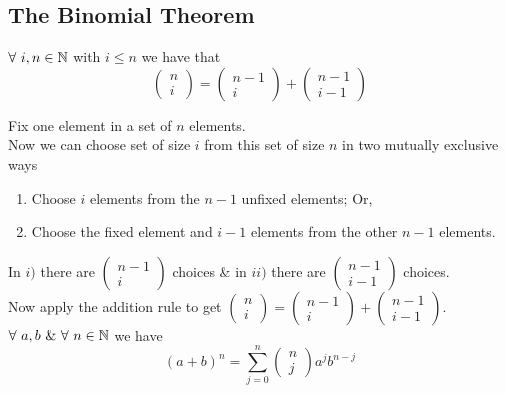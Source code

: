 \documentclass[11pt,a4paper]{article}
\begin{document}
\subsection{The Binomial Theorem}

$\forall\ i,n\in\mathbb{N}$ with $i\leq n$ we have that
$$\begin{pmatrix}n\\i\end{pmatrix}=\begin{pmatrix}n-1\\i\end{pmatrix}+\begin{pmatrix}n-1\\i-1\end{pmatrix}$$

Fix one element in a set of $n$ elements.\\
Now we can choose set of size $i$ from this set of size $n$ in two mutually exclusive ways
\begin{enumerate}[label=\roman*)]
	\item Choose $i$ elements from the $n-1$ unfixed elements; Or,
	\item Choose the fixed element and $i-1$ elements from the other $n-1$ elements.
\end{enumerate}
In $i)$ there are $\begin{pmatrix}n-1\\i\end{pmatrix}$ choices \& in $ii)$ there are $\begin{pmatrix}n-1\\i-1\end{pmatrix}$ choices.\\
Now apply the addition rule to get $\begin{pmatrix}n\\i\end{pmatrix}=\begin{pmatrix}n-1\\i\end{pmatrix}+\begin{pmatrix}n-1\\i-1\end{pmatrix}$.\\

$\forall\ a,b\ \&\ \forall\ n\in\nats$ we have
$$(a+b)^n=\sum_{j=0}^n\begin{pmatrix}n\\j\end{pmatrix}a^jb^{n-j}$$
\end{document}
